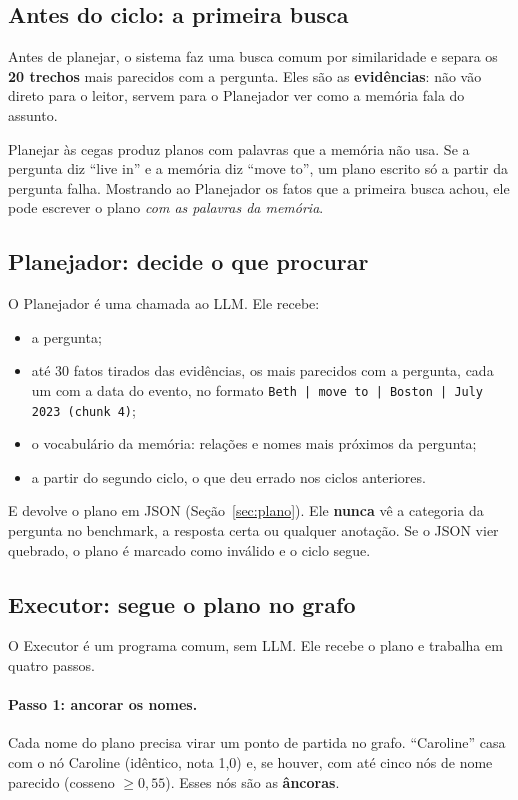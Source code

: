\documentclass[11pt]{article}
\begin{document}
\subsection{Antes do ciclo: a primeira busca}

Antes de planejar, o sistema faz uma busca comum por similaridade e separa os
\textbf{20 trechos} mais parecidos com a pergunta. Eles são as
\textbf{evidências}: não vão direto para o leitor, servem para o Planejador
ver como a memória fala do assunto.

\begin{porque}
Planejar às cegas produz planos com palavras que a memória não usa. Se a
pergunta diz ``live in'' e a memória diz ``move to'', um plano escrito só a
partir da pergunta falha. Mostrando ao Planejador os fatos que a primeira busca
achou, ele pode escrever o plano \emph{com as palavras da memória}.
\end{porque}

\subsection{Planejador: decide o que procurar}

O Planejador é uma chamada ao LLM. Ele recebe:
\begin{itemize}
\item a pergunta;
\item até 30 fatos tirados das evidências, os mais parecidos com a pergunta,
  cada um com a data do evento, no formato
  \texttt{Beth | move to | Boston | July 2023 (chunk 4)};
\item o vocabulário da memória: relações e nomes mais próximos da pergunta;
\item a partir do segundo ciclo, o que deu errado nos ciclos anteriores.
\end{itemize}
E devolve o plano em JSON (Seção~\ref{sec:plano}). Ele \textbf{nunca} vê a
categoria da pergunta no benchmark, a resposta certa ou qualquer anotação. Se o
JSON vier quebrado, o plano é marcado como inválido e o ciclo segue.

\subsection{Executor: segue o plano no grafo}
\label{sec:executor}

O Executor é um programa comum, sem LLM. Ele recebe o plano e trabalha em
quatro passos.

\paragraph{Passo 1: ancorar os nomes.} Cada nome do plano precisa virar um
ponto de partida no grafo. ``Caroline'' casa com o nó Caroline (idêntico,
nota 1,0) e, se houver, com até cinco nós de nome parecido (cosseno
$\ge0{,}55$). Esses nós são as \textbf{âncoras}.
\end{document}
